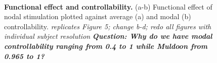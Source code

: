 \begin{figure}
\\
 \caption{\textbf{Functional effect and controllability.} (a-b) Functional effect of nodal stimulation plotted against average (a) and modal (b) controllability.
 \textit{replicates Figure 5; change b-d; redo all figures with individual subject resolution }\textbf{\textit{Question: Why do we have modal controllability 
 ranging from 0.4 to 1 while Muldoon from 0.965 to 1?}}} 
 \label{fig:controllability-functional-effect}
\end{figure}



